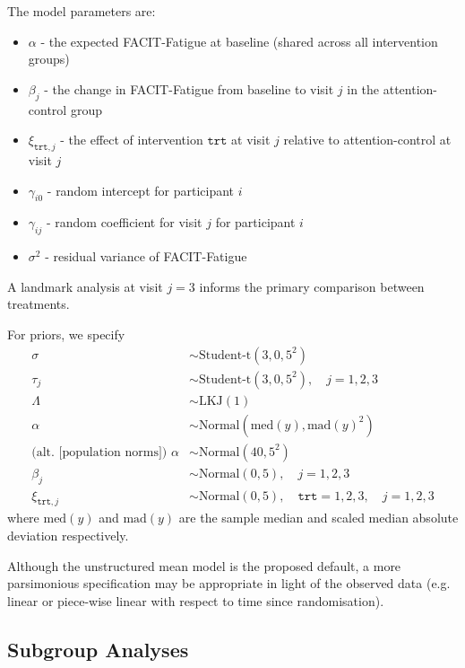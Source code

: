 \documentclass[
]{article}
\providecommand{\tightlist}{%
  \setlength{\itemsep}{0pt}\setlength{\parskip}{0pt}}
\begin{document}
The model parameters are:

\begin{itemize}
  \tightlist
  \item $\alpha$ - the expected FACIT-Fatigue at baseline (shared across all intervention groups)
  \item $\beta_j$ - the change in FACIT-Fatigue from baseline to visit $j$ in the attention-control group
  \item $\xi_{\texttt{trt},j}$ - the effect of intervention $\texttt{trt}$ at visit $j$ relative to attention-control at visit $j$
  \item $\gamma_{i0}$ - random intercept for participant $i$
  \item $\gamma_{ij}$ - random coefficient for visit $j$ for participant $i$
  \item $\sigma^2$ - residual variance of FACIT-Fatigue
\end{itemize}
A landmark analysis at visit $j=3$ informs the primary comparison between treatments.

For priors, we specify
$$
  \begin{aligned}
  \sigma &\sim \text{Student-t}(3, 0, 5^2) \\
  \tau_j &\sim \text{Student-t}(3, 0, 5^2),\quad j=1,2,3 \\
  \Lambda &\sim \text{LKJ}(1) \\
  \alpha &\sim \text{Normal}\left(\text{med}(y), \text{mad}(y)^2\right) \\
  \text{(alt. [population norms]) } \alpha &\sim \text{Normal}(40, 5^2) \\
  \beta_j &\sim \text{Normal}\left(0, 5\right),\quad j=1,2,3 \\
  \xi_{\texttt{trt},j} &\sim \text{Normal}(0, 5),\quad \texttt{trt}=1,2,3,\quad j=1,2,3
\end{aligned}
$$
where $\text{med}(y)$ and $\text{mad}(y)$ are the sample median and scaled median absolute deviation respectively.

Although the unstructured mean model is the proposed default, a more parsimonious specification may be appropriate in light of the observed data (e.g. linear or piece-wise linear with respect to time since randomisation).

\hypertarget{subgroup-analyses}{%
  \subsection{Subgroup Analyses}\label{subgroup-analyses}}
\end{document}
